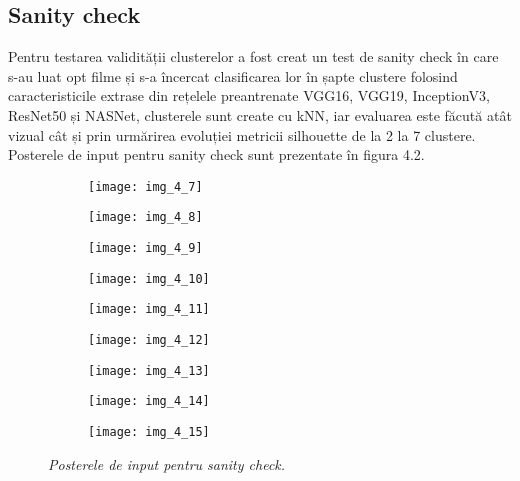 \subsection{Sanity check}
Pentru testarea validității clusterelor a fost creat un test de sanity check în care s-au luat opt filme și s-a încercat clasificarea lor în șapte clustere folosind caracteristicile extrase din rețelele preantrenate VGG16, VGG19, InceptionV3, ResNet50 și NASNet, clusterele sunt create cu kNN, iar evaluarea este făcută atât vizual cât și prin urmărirea evoluției metricii silhouette de la 2 la 7 clustere. Posterele de input pentru sanity check sunt prezentate în figura 4.2.
\begin{figure}[!h]
  \begin{subfigure}[b]{0.5\textwidth}
    \texttt{[image: img\_4\_7]}
  \end{subfigure}
  \hfill
  \begin{subfigure}[b]{0.5\textwidth}
    \texttt{[image: img\_4\_8]}
  \end{subfigure}
    \hfill
  \begin{subfigure}[b]{0.5\textwidth}
    \texttt{[image: img\_4\_9]}
  \end{subfigure}
  \hfill
  \begin{subfigure}[b]{0.5\textwidth}
    \texttt{[image: img\_4\_10]}
  \end{subfigure}
  \hfill
  \begin{subfigure}[b]{0.5\textwidth}
    \texttt{[image: img\_4\_11]}
  \end{subfigure}
  \hfill
  \begin{subfigure}[b]{0.5\textwidth}
    \texttt{[image: img\_4\_12]}
  \end{subfigure}
    \hfill
  \begin{subfigure}[b]{0.5\textwidth}
    \texttt{[image: img\_4\_13]}
  \end{subfigure}
    \hfill
  \begin{subfigure}[b]{0.5\textwidth}
    \texttt{[image: img\_4\_14]}
  \end{subfigure}
      \hfill
  \begin{subfigure}[b]{0.3\textwidth}
    \texttt{[image: img\_4\_15]}
  \end{subfigure}
  \caption[Postere input sanity check]{\textit{Posterele de input pentru sanity check.}}
\end{figure}

